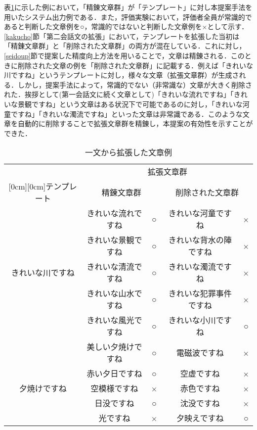 表\ref{tb:kekkaExam}に示した例において，「精錬文章群」が「テンプレート」に対し本提案手法を用いたシステム出力例である．また，評価実験において，評価者全員が常識的であると判断した文章例を○，常識的ではないと判断した文章例を×として示す．\ref{kakucho}節「第二会話文の拡張」において，テンプレートを拡張した当初は「精錬文章群」と「削除された文章群」の両方が混在している．これに対し，\ref{seidoup}節で提案した精度向上方法を用いることで，文章は精錬される．このときに削除された文章の例を「削除された文章群」に記載する．例えば「きれいな川ですね」というテンプレートに対し，様々な文章（拡張文章群）が生成される．しかし，提案手法によって，常識的でない（非常識な）文章が大きく削除された．挨拶として(第一会話文に続く文章として)「きれいな流れですね」「きれいな景観ですね」という文章はある状況下で可能であるのに対し，「きれいな河童ですね」「きれいな濁流ですね」といった文章は非常識である．このような文章を自動的に削除することで拡張文章群を精錬し，本提案の有効性を示すことができた．
\begin{table}[htbp]
	\caption{一文から拡張した文章例}
	\begin{center}
		\begin{tabular}{|c|c|c|c|c|}
		\hline  & \multicolumn{4}{|c|}{拡張文章群} \\ \cline{2-5}
		  		\raisebox{1.5ex}[0cm][0cm]{テンプレート}
		  		& \multicolumn{2}{|c|}{精錬文章群} & \multicolumn{2}{|c|}{削除された文章群} \\ \hline \hline
		 &  きれいな流れですね & ○ & きれいな河童ですね & × \\
		 & きれいな景観ですね & ○ & きれいな背水の陣ですね & × \\ 
		 きれいな川ですね & きれいな清流ですね & ○ & きれいな濁流ですね & × \\
		 & きれいな山水ですね & ○ & きれいな犯罪事件ですね & × \\
		 & きれいな風光ですね & ○ & きれいな小川ですね & ○ \\ \hline
		& 美しい夕焼けですね & ○ & 電磁波ですね & × \\
		& 赤い夕日ですね & ○ & 空虚ですね & × \\
		夕焼けですね 	& 空模様ですね & × & 赤色ですね & × \\
		& 日没ですね & ○ & 沈没ですね & × \\
		& 光ですね & × & 夕映えですね & ○ \\ \hline
		\end{tabular}
	\end{center}
	\label{tb:kekkaExam}
\end{table}

